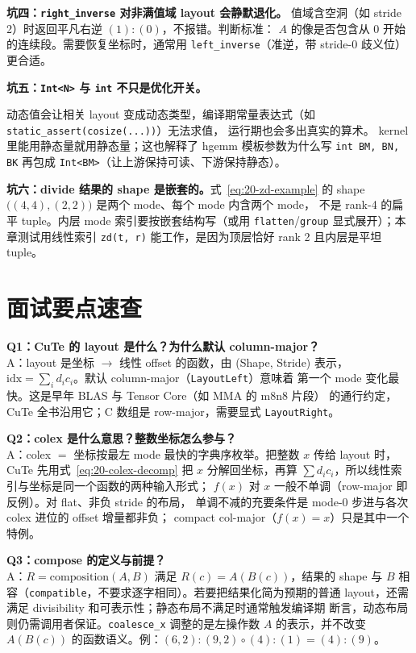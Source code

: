 \textbf{坑四：\texttt{right\_\allowbreak{}inverse} 对非满值域 layout 会静默退化。}
值域含空洞（如 stride 2）时返回平凡右逆 $(1){:}(0)$，不报错。判断标准：
$A$ 的像是否包含从 0 开始的连续段。需要恢复坐标时，通常用
\texttt{left\_\allowbreak{}inverse}（准逆，带 stride-0 歧义位）更合适。

\textbf{坑五：\texttt{Int<N>} 与 \texttt{int} 不只是优化开关。}
\begin{sloppypar}
动态值会让相关 layout 变成动态类型，编译期常量表达式（如
\texttt{static\_\allowbreak{}assert}\allowbreak\texttt{\allowbreak{}(cosize\allowbreak{}(.\allowbreak{}.\allowbreak{}.\allowbreak{}))}）无法求值，
运行期也会多出真实的算术。
kernel 里能用静态量就用静态量；这也解释了 hgemm 模板参数为什么写
\texttt{int BM, BN, BK} 再包成 \texttt{Int<BM>}（让上游保持可读、下游保持静态）。
\end{sloppypar}

\textbf{坑六：divide 结果的 shape 是嵌套的。}式~\eqref{eq:20-zd-example} 的
shape $\bigl((4,4),(2,2)\bigr)$ 是两个 mode、每个 mode 内含两个 mode，
不是 rank-4 的扁平 tuple。内层 mode 索引要按嵌套结构写（或用
\texttt{flatten}/\texttt{group} 显式展开）；本章测试用线性索引
\texttt{zd(t, r)} 能工作，是因为顶层恰好 rank 2 且内层是平坦 tuple。

\section{面试要点速查}

\textbf{Q1：CuTe 的 layout 是什么？为什么默认 column-major？}\\
A：layout 是坐标 $\to$ 线性 offset 的函数，由 (Shape, Stride) 表示，
$\mathrm{idx}=\sum_i d_i c_i$。默认 column-major（\texttt{LayoutLeft}）意味着
第一个 mode 变化最快。这是早年 BLAS 与 Tensor Core（如 MMA 的 m8n8 片段）
的通行约定，CuTe 全书沿用它；C 数组是 row-major，需要显式
\texttt{LayoutRight}。

\textbf{Q2：colex 是什么意思？整数坐标怎么参与？}\\
A：colex $=$ 坐标按最左 mode 最快的字典序枚举。把整数 $x$ 传给 layout 时，
CuTe 先用式~\eqref{eq:20-colex-decomp} 把 $x$ 分解回坐标，再算
$\sum d_i c_i$，所以线性索引与坐标是同一个函数的两种输入形式；
$f(x)$ 对 $x$ 一般不单调（row-major 即反例）。对 flat、非负 stride 的布局，
单调不减的充要条件是 mode-0 步进与各次 colex 进位的 offset 增量都非负；
compact col-major（$f(x)=x$）只是其中一个特例。

\textbf{Q3：compose 的定义与前提？}\\
A：$R=\mathrm{composition}(A,B)$ 满足 $R(c)=A(B(c))$，结果的 shape 与 $B$
相容（\texttt{compatible}，不要求逐字相同）。若要把结果化简为预期的普通
layout，还需满足 divisibility 和可表示性；静态布局不满足时通常触发编译期
断言，动态布局则仍需调用者保证。\texttt{coalesce\_x} 调整的是左操作数 $A$
的表示，并不改变 $A(B(c))$ 的函数语义。例：$(6,2){:}(9,2)\circ(4){:}(1)=(4){:}(9)$。

